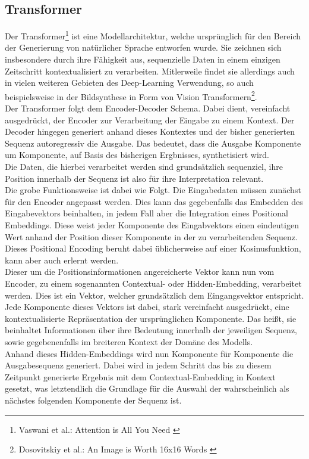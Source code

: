 \subsection{Transformer}

Der Transformer\footnote{
    Vaswani et al.: Attention is All You Need
    \cite{vaswani2023attentionneed}
} ist eine Modellarchitektur, welche ursprünglich für den Bereich der Generierung von natürlicher Sprache entworfen wurde. Sie zeichnen sich insbesondere durch ihre Fähigkeit aus, sequenzielle Daten in einem einzigen Zeitschritt kontextualisiert zu verarbeiten. Mitlerweile findet sie allerdings auch in vielen weiteren Gebieten des Deep-Learning Verwendung, so auch beispielsweise in der Bildsynthese in Form von Vision Transformern\footnote{
    Dosovitskiy et al.: An Image is Worth 16x16 Words 
    \cite{dosovitskiy2021imageworth16x16words}
}. \\ 
Der Transformer folgt dem Encoder-Decoder Schema. Dabei dient, vereinfacht ausgedrückt, der Encoder zur Verarbeitung der Eingabe zu einem Kontext. Der Decoder hingegen generiert anhand dieses Kontextes und der bisher generierten Sequenz autoregressiv die Ausgabe. Das bedeutet, dass die Ausgabe Komponente um Komponente, auf Basis des bisherigen Ergbnisses, synthetisiert wird. \\ 
Die Daten, die hierbei verarbeitet werden sind grundsätzlich sequenziel, ihre Position innerhalb der Sequenz ist also für ihre Interpretation relevant. \\
Die grobe Funktionsweise ist dabei wie Folgt. Die Eingabedaten müssen zunächst für den Encoder angepasst werden. Dies kann das gegebenfalls das Embedden des Eingabevektors beinhalten, in jedem Fall aber die Integration eines Positional Embeddings. Diese weist jeder Komponente des Eingabvektors einen eindeutigen Wert anhand der Position dieser Komponente in der zu verarbeitenden Sequenz. Dieses Positional Encoding beruht dabei üblicherweise auf einer Kosinusfunktion, kann aber auch erlernt werden. \\
Dieser um die Positionsinformationen angereicherte Vektor kann nun vom Encoder, zu einem sogenannten Contextual- oder Hidden-Embedding, verarbeitet werden. Dies ist ein Vektor, welcher grundsätzlich dem Eingangsvektor entspricht. Jede Komponente dieses Vektors ist dabei, stark vereinfacht ausgedrückt, eine kontextualisierte Repräsentation der ursprünglichen Komponente. Das heißt, sie beinhaltet Informationen über ihre Bedeutung innerhalb der jeweiligen Sequenz, sowie gegebenenfalls im breiteren Kontext der Domäne des Modells. \\
Anhand dieses Hidden-Embeddings wird nun Komponente für Komponente die Ausgabesequenz generiert. Dabei wird in jedem Schritt das bis zu diesem Zeitpunkt generierte Ergebnis mit dem Contextual-Embedding in Kontext gesetzt, was letztendlich die Grundlage für die Auswahl der wahrscheinlich als nächstes folgenden Komponente der Sequenz ist.

